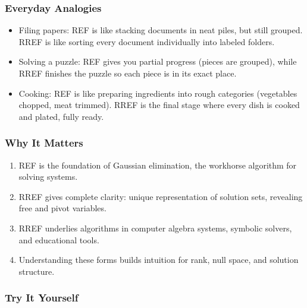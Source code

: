 \documentclass[
  letterpaper,
  DIV=11,
  numbers=noendperiod]{scrreprt}
\providecommand{\tightlist}{%
  \setlength{\itemsep}{0pt}\setlength{\parskip}{0pt}}
\begin{document}
\subsubsection{Everyday Analogies}\label{everyday-analogies-19}

\begin{itemize}
\tightlist
\item
  Filing papers: REF is like stacking documents in neat piles, but still
  grouped. RREF is like sorting every document individually into labeled
  folders.
\item
  Solving a puzzle: REF gives you partial progress (pieces are grouped),
  while RREF finishes the puzzle so each piece is in its exact place.
\item
  Cooking: REF is like preparing ingredients into rough categories
  (vegetables chopped, meat trimmed). RREF is the final stage where
  every dish is cooked and plated, fully ready.
\end{itemize}

\subsubsection{Why It Matters}\label{why-it-matters-19}

\begin{enumerate}
\def\labelenumi{\arabic{enumi}.}
\tightlist
\item
  REF is the foundation of Gaussian elimination, the workhorse algorithm
  for solving systems.
\item
  RREF gives complete clarity: unique representation of solution sets,
  revealing free and pivot variables.
\item
  RREF underlies algorithms in computer algebra systems, symbolic
  solvers, and educational tools.
\item
  Understanding these forms builds intuition for rank, null space, and
  solution structure.
\end{enumerate}

\subsubsection{Try It Yourself}\label{try-it-yourself-22}
\end{document}
